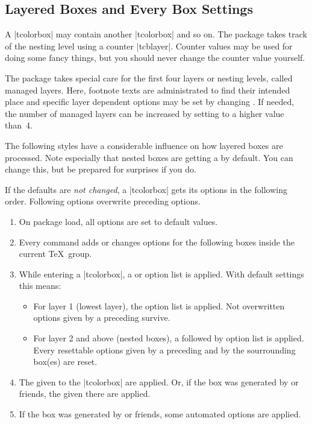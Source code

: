 \clearpage
\subsection{Layered Boxes and Every Box Settings}\label{subsec:everybox}
A |tcolorbox| may contain another |tcolorbox| and so on. The package
takes track of the nesting level using a counter |tcblayer|. Counter values
may be used for doing some fancy things, but you should never change
the counter value yourself.

The package takes special care for the first four layers or nesting levels,
called managed layers.
Here, footnote texts are administrated to find their intended place
and specific layer dependent options may be set by changing
.
If needed, the number of managed layers can be increased by setting
 to a higher value than~4.

The following styles have a considerable influence on how layered boxes
are processed. Note especially that nested boxes are getting a
 by default. You can change this, but be prepared for
surprises if you do.

If the defaults are \emph{not changed}, a |tcolorbox| gets its options
in the following order. Following options overwrite preceding options.
\begin{enumerate}
\item On package load, all options are set to default values.
\item Every  command adds or changes options for the following boxes
  inside the current \TeX\ group.
\item While entering a |tcolorbox|, a  or
   option list is applied.
  With default settings this means:
  \begin{itemize}
  \item For layer 1 (lowest layer), the  option list is applied.
    Not overwritten options given by a preceding  survive.
  \item For layer 2 and above (nested boxes), a  followed by
     option list is applied.
    Every resettable options given by a preceding 
    and by the sourrounding box(es) are reset.
  \end{itemize}
\item The  given to the |tcolorbox| are applied.
  Or, if the box was generated by  or friends,
  the  given there are applied.
\item If the box was generated by  or friends,
  some automated options are applied.
\end{enumerate}


